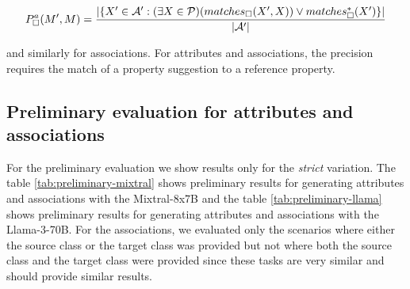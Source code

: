 \[P^a_\Box(M',M) = \frac{\vert \{X' \in {\cal A}': (\exists X \in {\cal P})(matches_\Box(X',X)) \lor matches^*_\Box(X') \}\vert}{\vert {\cal A'} \vert}\]

\noindent and similarly for associations. For attributes and associations, the precision requires the match of a property suggestion to a reference property.


\subsection{Preliminary evaluation for attributes and associations}
\label{sec:preliminary_attributes_associations}

For the preliminary evaluation we show results only for the \textit{strict} variation. The table \ref{tab:preliminary-mixtral} shows preliminary results for generating attributes and associations with the Mixtral-8x7B and the table \ref{tab:preliminary-llama} shows preliminary results for generating attributes and associations with the Llama-3-70B. For the associations, we evaluated only the scenarios where either the source class or the target class was provided but not where both the source class and the target class were provided since these tasks are very similar and should provide similar results.

